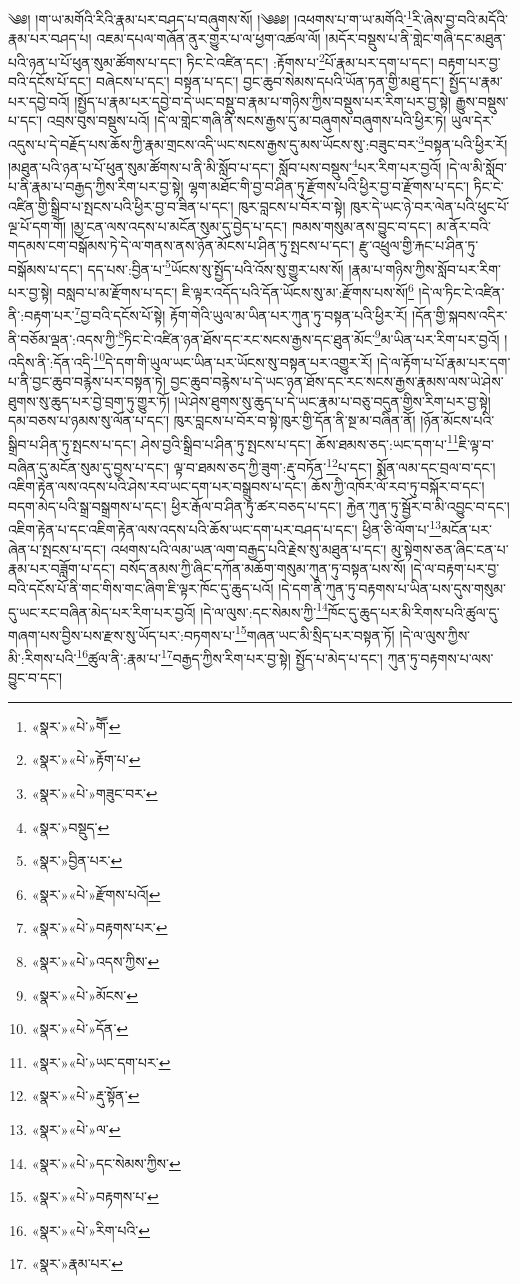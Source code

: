 ༄༅། །ག་ཡ་མགོའི་རིའི་རྣམ་པར་བཤད་པ་བཞུགས་སོ། །༄༅༅། །འཕགས་པ་ག་ཡ་མགོའི་\footnote{«སྣར་»«པེ་»གཽ་}རི་ཞེས་བྱ་བའི་མདོའི་རྣམ་པར་བཤད་པ། འཇམ་དཔལ་གཞོན་ནུར་གྱུར་པ་ལ་ཕྱག་འཚལ་ལོ། །མདོར་བསྡུས་པ་ནི་གླེང་གཞི་དང་མཐུན་པའི་ཉན་པ་པོ་ཕུན་སུམ་ཚོགས་པ་དང་། ཏིང་ངེ་འཛིན་དང་། :རྟོགས་པ་\footnote{«སྣར་»«པེ་»རྟོག་པ་}པོ་རྣམ་པར་དག་པ་དང་། བརྟག་པར་བྱ་བའི་དངོས་པོ་དང་། བཞེངས་པ་དང་། བསྟན་པ་དང་། བྱང་ཆུབ་སེམས་དཔའི་ཡོན་ཏན་གྱི་མཐུ་དང་། སྤྱོད་པ་རྣམ་པར་དབྱེ་བའོ། །སྤྱོད་པ་རྣམ་པར་དབྱེ་བ་དེ་ཡང་བསྡུ་བ་རྣམ་པ་གཉིས་ཀྱིས་བསྡུས་པར་རིག་པར་བྱ་སྟེ། རྒྱུས་བསྡུས་པ་དང་། འབྲས་བུས་བསྡུས་པའོ། །དེ་ལ་གླེང་གཞི་ནི་སངས་རྒྱས་དུ་མ་བཞུགས་བཞུགས་པའི་ཕྱིར་ཏེ། ཡུལ་དེར་འདུས་པ་དེ་བརྗོད་པས་ཆོས་ཀྱི་རྣམ་གྲངས་འདི་ཡང་སངས་རྒྱས་དུ་མས་ཡོངས་སུ་:བཟུང་བར་\footnote{«སྣར་»«པེ་»གཟུང་བར་}བསྟན་པའི་ཕྱིར་རོ། །མཐུན་པའི་ཉན་པ་པོ་ཕུན་སུམ་ཚོགས་པ་ནི་མི་སློབ་པ་དང་། སློབ་པས་བསྡུས་\footnote{«སྣར་»བསྡུད་}པར་རིག་པར་བྱའོ། །དེ་ལ་མི་སློབ་པ་ནི་རྣམ་པ་བརྒྱད་ཀྱིས་རིག་པར་བྱ་སྟེ། ལྷག་མཐོང་གི་བྱ་བ་ཤིན་ཏུ་རྫོགས་པའི་ཕྱིར་བྱ་བ་རྫོགས་པ་དང་། ཏིང་ངེ་འཛིན་གྱི་སྒྲིབ་པ་སྤངས་པའི་ཕྱིར་བྱ་བ་ཟིན་པ་དང་། ཁུར་བླངས་པ་བོར་བ་སྟེ། ཁུར་དེ་ཡང་ཉེ་བར་ལེན་པའི་ཕུང་པོ་ལྔ་པོ་དག་གོ། །མྱ་ངན་ལས་འདས་པ་མངོན་སུམ་དུ་བྱེད་པ་དང་། ཁམས་གསུམ་ནས་བྱུང་བ་དང་། མ་ནོར་བའི་གདམས་ངག་བསྒོམས་ཏེ་དེ་ལ་གནས་ནས་ཉོན་མོངས་པ་ཤིན་ཏུ་སྤངས་པ་དང་། རྫུ་འཕྲུལ་གྱི་རྐང་པ་ཤིན་ཏུ་བསྒོམས་པ་དང་། དད་པས་:བྱིན་པ་\footnote{«སྣར་»བྱིན་པར་}ཡོངས་སུ་སྤྱོད་པའི་འོས་སུ་གྱུར་པས་སོ། །རྣམ་པ་གཉིས་ཀྱིས་སློབ་པར་རིག་པར་བྱ་སྟེ། བསླབ་པ་མ་རྫོགས་པ་དང་། ཇི་ལྟར་འདོད་པའི་དོན་ཡོངས་སུ་མ་:རྫོགས་པས་སོ།\footnote{«སྣར་»«པེ་»རྫོགས་པའོ།} །དེ་ལ་ཏིང་ངེ་འཛིན་ནི་:བརྟག་པར་\footnote{«སྣར་»«པེ་»བརྟགས་པར་}བྱ་བའི་དངོས་པོ་སྟེ། རྟོག་གེའི་ཡུལ་མ་ཡིན་པར་ཀུན་ཏུ་བསྟན་པའི་ཕྱིར་རོ། །དོན་གྱི་སྐབས་འདིར་ནི་བཅོམ་ལྡན་:འདས་ཀྱི་\footnote{«སྣར་»«པེ་»འདས་ཀྱིས་}ཏིང་ངེ་འཛིན་ཉན་ཐོས་དང་རང་སངས་རྒྱས་དང་ཐུན་མོང་\footnote{«སྣར་»«པེ་»མོངས་}མ་ཡིན་པར་རིག་པར་བྱའོ། །འདིས་ནི་:དོན་འདི་\footnote{«སྣར་»«པེ་»དོན་}དེ་དག་གི་ཡུལ་ཡང་ཡིན་པར་ཡོངས་སུ་བསྟན་པར་འགྱུར་རོ། །དེ་ལ་རྟོག་པ་པོ་རྣམ་པར་དག་པ་ནི་བྱང་ཆུབ་བརྙེས་པར་བསྟན་ཏེ། བྱང་ཆུབ་བརྙེས་པ་དེ་ཡང་ཉན་ཐོས་དང་རང་སངས་རྒྱས་རྣམས་ལས་ཡེ་ཤེས་ཐུགས་སུ་ཆུད་པར་བྱེ་བྲག་ཏུ་གྱུར་ཏོ། །ཡེ་ཤེས་ཐུགས་སུ་ཆུད་པ་དེ་ཡང་རྣམ་པ་བཅུ་བདུན་གྱིས་རིག་པར་བྱ་སྟེ། དམ་བཅས་པ་ཉམས་སུ་ལོན་པ་དང་། ཁུར་བླངས་པ་བོར་བ་སྟེ་ཁུར་གྱི་དོན་ནི་སྔ་མ་བཞིན་ནོ། །ཉོན་མོངས་པའི་སྒྲིབ་པ་ཤིན་ཏུ་སྤངས་པ་དང་། ཤེས་བྱའི་སྒྲིབ་པ་ཤིན་ཏུ་སྤངས་པ་དང་། ཆོས་ཐམས་ཅད་:ཡང་དག་པ་\footnote{«སྣར་»«པེ་»ཡང་དག་པར་}ཇི་ལྟ་བ་བཞིན་དུ་མངོན་སུམ་དུ་བྱས་པ་དང་། ལྟ་བ་ཐམས་ཅད་ཀྱི་ཟུག་:རྡུ་བཏོན་\footnote{«སྣར་»«པེ་»རྡུ་སྟོན་}པ་དང་། སྨོན་ལམ་དང་བྲལ་བ་དང་། འཇིག་རྟེན་ལས་འདས་པའི་ཤེས་རབ་ཡང་དག་པར་བསྒྲུབས་པ་དང་། ཆོས་ཀྱི་འཁོར་ལོ་རབ་ཏུ་བསྐོར་བ་དང་། བདག་མེད་པའི་སྒྲ་བསྒྲགས་པ་དང་། ཕྱིར་རྒོལ་བ་ཤིན་ཏུ་ཚར་བཅད་པ་དང་། རྐྱེན་ཀུན་ཏུ་སྦྱོར་བ་མི་འབྱུང་བ་དང་། འཇིག་རྟེན་པ་དང་འཇིག་རྟེན་ལས་འདས་པའི་ཆོས་ཡང་དག་པར་བཤད་པ་དང་། ཕྱིན་ཅི་ལོག་པ་\footnote{«སྣར་»«པེ་»ལ་}མངོན་པར་ཞེན་པ་སྤངས་པ་དང་། འཕགས་པའི་ལམ་ཡན་ལག་བརྒྱད་པའི་རྗེས་སུ་མཐུན་པ་དང་། མུ་སྟེགས་ཅན་ཞིང་ངན་པ་རྣམ་པར་བཟློག་པ་དང་། བསོད་ནམས་ཀྱི་ཞིང་དཀོན་མཆོག་གསུམ་ཀུན་ཏུ་བསྟན་པས་སོ། །དེ་ལ་བརྟག་པར་བྱ་བའི་དངོས་པོ་ནི་གང་གིས་གང་ཞིག་ཇི་ལྟར་ཁོང་དུ་ཆུད་པའོ། །དེ་དག་ནི་ཀུན་ཏུ་བརྟགས་པ་ཡིན་པས་དུས་གསུམ་དུ་ཡང་རང་བཞིན་མེད་པར་རིག་པར་བྱའོ། །དེ་ལ་ལུས་:དང་སེམས་ཀྱི་\footnote{«སྣར་»«པེ་»དང་སེམས་ཀྱིས་}ཁོང་དུ་ཆུད་པར་མི་རིགས་པའི་ཚུལ་དུ་གཞག་པས་བྱིས་པས་རྫས་སུ་ཡོད་པར་:བཏགས་པ་\footnote{«སྣར་»«པེ་»བརྟགས་པ་}གཞན་ཡང་མི་སྲིད་པར་བསྟན་ཏོ། །དེ་ལ་ལུས་ཀྱིས་མི་:རིགས་པའི་\footnote{«སྣར་»«པེ་»རིག་པའི་}ཚུལ་ནི་:རྣམ་པ་\footnote{«སྣར་»རྣམ་པར་}བརྒྱད་ཀྱིས་རིག་པར་བྱ་སྟེ། སྤྱོད་པ་མེད་པ་དང་། ཀུན་ཏུ་བརྟགས་པ་ལས་བྱུང་བ་དང་། 